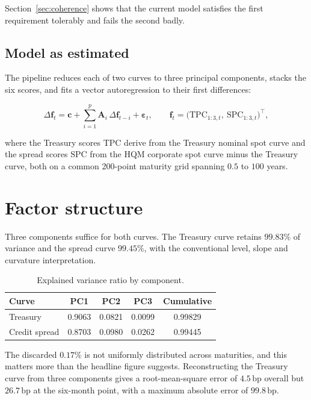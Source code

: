 \documentclass[11pt,a4paper]{article}
\newcommand{\bp}{\,\text{bp}}
\begin{document}
Section~\ref{sec:coherence} shows that the current model satisfies the first
requirement tolerably and fails the second badly.

\subsection{Model as estimated}

The pipeline reduces each of two curves to three principal components, stacks the
six scores, and fits a vector autoregression to their first differences:

\begin{equation}
  \Delta \mathbf{f}_t = \mathbf{c} + \sum_{i=1}^{p} \mathbf{A}_i \,
  \Delta \mathbf{f}_{t-i} + \boldsymbol{\varepsilon}_t ,
  \qquad
  \mathbf{f}_t = \big(\text{TPC}_{1:3,t},\ \text{SPC}_{1:3,t}\big)^{\!\top} ,
\end{equation}

where the Treasury scores $\text{TPC}$ derive from the Treasury nominal spot
curve and the spread scores $\text{SPC}$ from the HQM corporate spot curve minus
the Treasury curve, both on a common 200-point maturity grid spanning
$0.5$ to $100$ years.

\section{Factor structure}

Three components suffice for both curves. The Treasury curve retains $99.83\%$
of variance and the spread curve $99.45\%$, with the conventional level, slope
and curvature interpretation.

\begin{table}[htbp]
\centering
\caption{Explained variance ratio by component.}
\label{tab:evr}
\begin{tabular}{lcccc}
\toprule
Curve & PC1 & PC2 & PC3 & Cumulative \\
\midrule
Treasury      & 0.9063 & 0.0821 & 0.0099 & 0.99829 \\
Credit spread & 0.8703 & 0.0980 & 0.0262 & 0.99445 \\
\bottomrule
\end{tabular}
\end{table}

The discarded $0.17\%$ is not uniformly distributed across maturities, and this
matters more than the headline figure suggests. Reconstructing the Treasury
curve from three components gives a root-mean-square error of $4.5\bp$ overall
but $26.7\bp$ at the six-month point, with a maximum absolute error of
$99.8\bp$.
\end{document}
